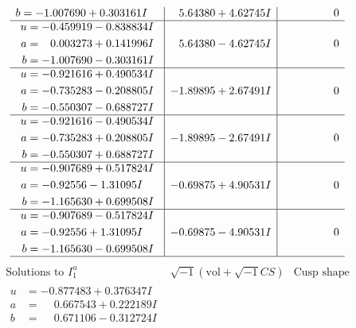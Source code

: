 \documentclass[1p]{elsarticle_modified}
\theoremstyle{definition}
\newcommand{\I}{\sqrt{-1}}
\begin{document}
$$\begin{array}{c|c|c}
\begin{aligned}
b &= -1.007690 + 0.303161 I\end{aligned}
 & \phantom{-}5.64380 + 4.62745 I & \phantom{-0.000000 } 0 \\ \hline\begin{aligned}
u &= -0.459919 - 0.838834 I \\
a &= \phantom{-}0.003273 + 0.141996 I \\
b &= -1.007690 - 0.303161 I\end{aligned}
 & \phantom{-}5.64380 - 4.62745 I & \phantom{-0.000000 } 0 \\ \hline\begin{aligned}
u &= -0.921616 + 0.490534 I \\
a &= -0.735283 - 0.208805 I \\
b &= -0.550307 - 0.688727 I\end{aligned}
 & -1.89895 + 2.67491 I & \phantom{-0.000000 } 0 \\ \hline\begin{aligned}
u &= -0.921616 - 0.490534 I \\
a &= -0.735283 + 0.208805 I \\
b &= -0.550307 + 0.688727 I\end{aligned}
 & -1.89895 - 2.67491 I & \phantom{-0.000000 } 0 \\ \hline\begin{aligned}
u &= -0.907689 + 0.517824 I \\
a &= -0.92556 - 1.31095 I \\
b &= -1.165630 + 0.699508 I\end{aligned}
 & -0.69875 + 4.90531 I & \phantom{-0.000000 } 0 \\ \hline\begin{aligned}
u &= -0.907689 - 0.517824 I \\
a &= -0.92556 + 1.31095 I \\
b &= -1.165630 - 0.699508 I\end{aligned}
 & -0.69875 - 4.90531 I & \phantom{-0.000000 } 0\\
 \hline 
 \end{array}$$\newpage$$\begin{array}{c|c|c}  
\text{Solutions to }I^u_{1}& \I (\text{vol} + \sqrt{-1}CS) & \text{Cusp shape}\\
 \hline 
\begin{aligned}
u &= -0.877483 + 0.376347 I \\
a &= \phantom{-}0.667543 + 0.222189 I \\
b &= \phantom{-}0.671106 - 0.312724 I\end{aligned}

\end{array}$$
\end{document}
